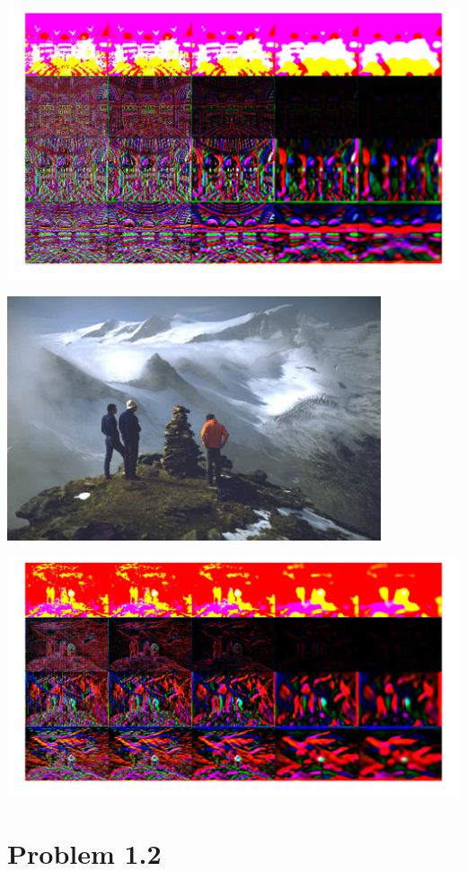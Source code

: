 \documentclass[a4paper,11pt]{article}
\begin{document}
\includegraphics[width=\textwidth]{release/matlab/Montage5}
\begin{center}
	\includegraphics[width=11cm]{release/matlab/fig6}
\end{center}
\includegraphics[width=\textwidth]{release/matlab/Montage6}

\section*{Problem 1.2}
\end{document}
